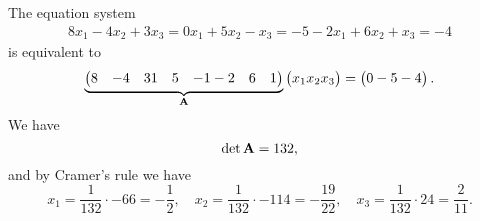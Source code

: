 \documentclass[hyperref, a4paper]{article}
\def\\{}%
\newcommand*{\mat}[1]{\vb{#1}}
\begin{document}
\section{}

The equation system 
\begin{equation}
    \begin{gathered}
        8 x_1-4 x_2+3 x_3=0 \\
        x_1+5 x_2-x_3=-5 \\
        -2 x_1+6 x_2+x_3=-4
        \end{gathered}
\end{equation}
is equivalent to 
\begin{equation}
    \underbrace{\pmqty{
        8 & - 4 & 3 \\
        1 & 5 & -1 \\
        -2 & 6 & 1
    }}_{\mat{A}} \pmqty{x_1 \\ x_2 \\ x_3} 
    = \pmqty{0 \\ -5 \\ -4}.
\end{equation}
We have 
\begin{equation}
    \det \mat{A} = 132, 
\end{equation}
and by Cramer's rule we have 
\begin{equation}
    x_1 = \frac{1}{132} \cdot -66 = - \frac{1}{2}, \quad 
    x_2 = \frac{1}{132} \cdot -114 = - \frac{19}{22}, \quad 
    x_3 = \frac{1}{132} \cdot 24 = \frac{2}{11}.
\end{equation}

\section{}

\section{}
\end{document}
